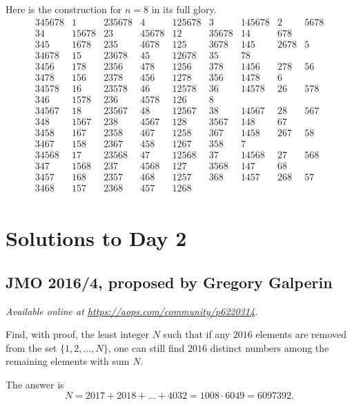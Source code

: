 \documentclass[11pt]{scrartcl}
\begin{document}
\begin{remark*}
  Here is the construction for $n=8$ in its full glory.
\[
 \begin{array}{ccccccccc}
 345678 & 1 & 235678 & 4 & 125678 & 3 & 145678 & 2 & 5678 \\
 34 & 15678 & 23 & 45678 & 12 & 35678 & 14 & 678 & \\
 345 & 1678 & 235 & 4678 & 125 & 3678 & 145 & 2678 & 5 \\
 34678 & 15 & 23678 & 45 & 12678 & 35 & 78 & & \\\hline
 3456 & 178 & 2356 & 478 & 1256 & 378 & 1456 & 278 & 56 \\
 3478 & 156 & 2378 & 456 & 1278 & 356 & 1478 & 6 & \\
 34578 & 16 & 23578 & 46 & 12578 & 36 & 14578 & 26 & 578 \\
 346 & 1578 & 236 & 4578 & 126 & 8 & & & \\ \hline\hline
 34567 & 18 & 23567 & 48 & 12567 & 38 & 14567 & 28 & 567 \\
 348 & 1567 & 238 & 4567 & 128 & 3567 & 148 & 67 & \\
 3458 & 167 & 2358 & 467 & 1258 & 367 & 1458 & 267 & 58 \\
 3467 & 158 & 2367 & 458 & 1267 & 358 & 7 & & \\\hline
 34568 & 17 & 23568 & 47 & 12568 & 37 & 14568 & 27 & 568 \\
 347 & 1568 & 237 & 4568 & 127 & 3568 & 147 & 68 & \\
 3457 & 168 & 2357 & 468 & 1257 & 368 & 1457 & 268 & 57 \\
 3468 & 157 & 2368 & 457 & 1268 & & & & \\
 \end{array}
\]
\end{remark*}
\pagebreak

\section{Solutions to Day 2}
\subsection{JMO 2016/4, proposed by Gregory Galperin}
\textsl{Available online at \url{https://aops.com/community/p6220314}.}
\begin{mdframed}[style=mdpurplebox,frametitle={Problem statement}]
Find, with proof, the least integer $N$ such that
if any $2016$ elements are removed
from the set $\{1, 2, \dots, N\}$,
one can still find $2016$ distinct numbers
among the remaining elements with sum $N$.
\end{mdframed}
The answer is
\[ N = 2017 + 2018 + \dots + 4032
  = 1008 \cdot 6049 = 6097392. \]
\end{document}
